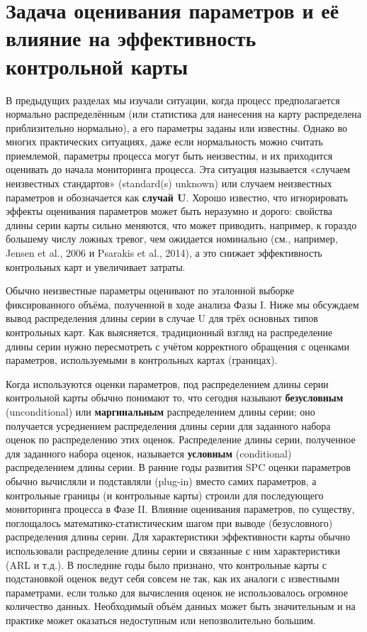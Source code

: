 \section{Задача оценивания параметров и её влияние на эффективность контрольной карты}

В предыдущих разделах мы изучали ситуации, когда процесс предполагается нормально распределённым (или статистика для нанесения на карту распределена приблизительно нормально), а его параметры заданы или известны. Однако во многих практических ситуациях, даже если нормальность можно считать приемлемой, параметры процесса могут быть неизвестны, и их приходится оценивать до начала мониторинга процесса. Эта ситуация называется «случаем неизвестных стандартов» (standard(s) unknown) или случаем неизвестных параметров и обозначается как \textbf{случай U}. Хорошо известно, что игнорировать эффекты оценивания параметров может быть неразумно и дорого: свойства длины серии карты сильно меняются, что может приводить, например, к гораздо большему числу ложных тревог, чем ожидается номинально (см., например, Jensen et al., 2006 и Psarakis et al., 2014), а это снижает эффективность контрольных карт и увеличивает затраты.

Обычно неизвестные параметры оценивают по эталонной выборке фиксированного объёма, полученной в ходе анализа Фазы I. Ниже мы обсуждаем вывод распределения длины серии в случае U для трёх основных типов контрольных карт. Как выясняется, традиционный взгляд на распределение длины серии нужно пересмотреть с учётом корректного обращения с оценками параметров, используемыми в контрольных картах (границах).

Когда используются оценки параметров, под распределением длины серии контрольной карты обычно понимают то, что сегодня называют \textbf{безусловным} (unconditional) или \textbf{маргинальным} распределением длины серии; оно получается усреднением распределения длины серии для заданного набора оценок по распределению этих оценок. Распределение длины серии, полученное для заданного набора оценок, называется \textbf{условным} (conditional) распределением длины серии. В ранние годы развития SPC оценки параметров обычно вычисляли и подставляли (plug-in) вместо самих параметров, а контрольные границы (и контрольные карты) строили для последующего мониторинга процесса в Фазе II. Влияние оценивания параметров, по существу, поглощалось математико-статистическим шагом при выводе (безусловного) распределения длины серии. Для характеристики эффективности карты обычно использовали распределение длины серии и связанные с ним характеристики (ARL и т.д.). В последние годы было признано, что контрольные карты с подстановкой оценок ведут себя совсем не так, как их аналоги с известными параметрами, если только для вычисления оценок не использовалось огромное количество данных. Необходимый объём данных может быть значительным и на практике может оказаться недоступным или непозволительно большим.


